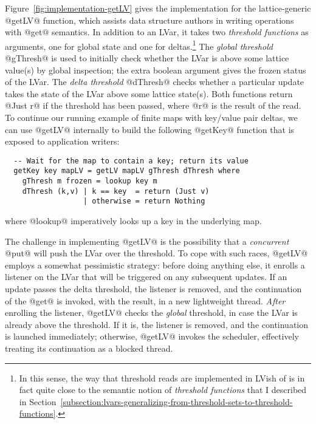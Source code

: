 Figure~\ref{fig:implementation-getLV} gives the implementation for the
lattice-generic @getLV@ function, which assists data structure authors
in writing operations with @get@ semantics.  In addition to an LVar,
it takes two \emph{threshold functions} as arguments, one for global
state and one for deltas.\footnote{In this sense, the way that
  threshold reads are implemented in LVish of is in fact quite close
  to the semantic notion of \emph{threshold functions} that I
  described in
  Section~\ref{subsection:lvars-generalizing-from-threshold-sets-to-threshold-functions}.}
The \emph{global threshold} @gThresh@ is used to initially check
whether the LVar is above some lattice value(s) by global inspection;
the extra boolean argument gives the frozen status of the LVar.  The
\emph{delta threshold} @dThresh@ checks whether a particular update
takes the state of the LVar above some lattice state(s).  Both
functions return @Just r@ if the threshold has been passed, where @r@
is the result of the read.  To continue our running example of finite
maps with key/value pair deltas, we can use @getLV@ internally to
build the following @getKey@ function that is exposed to application
writers:

\singlespacing
\begin{lstlisting}
  -- Wait for the map to contain a key; return its value
  getKey key mapLV = getLV mapLV gThresh dThresh where
    gThresh m frozen = lookup key m
    dThresh (k,v) | k == key  = return (Just v)
                  | otherwise = return Nothing 
\end{lstlisting}
\doublespacing

where @lookup@ imperatively looks up a key in the underlying map.

The challenge in implementing @getLV@ is the possibility that a
\emph{concurrent} @put@ will push the LVar over the threshold.  To
cope with such races, @getLV@ employs a somewhat pessimistic strategy:
before doing anything else, it enrolls a listener on the LVar that
will be triggered on any subsequent updates.  If an update passes the
delta threshold, the listener is removed, and the continuation of the
@get@ is invoked, with the result, in a new lightweight thread.
\emph{After} enrolling the listener, @getLV@ checks the \emph{global}
threshold, in case the LVar is already above the threshold.  If it is,
the listener is removed, and the continuation is launched immediately;
otherwise, @getLV@ invokes the scheduler, effectively treating its
continuation as a blocked thread.


